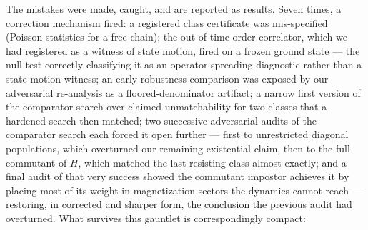 \documentclass[a4paper,11pt,noarxiv]{quantumarticle}
\begin{document}
The mistakes were made, caught, and are reported as results. Seven
times, a correction mechanism fired: a registered class certificate
was mis-specified (Poisson statistics for a free chain); the
out-of-time-order correlator, which we had registered as a witness of
state motion, fired on a frozen ground state --- the null test
correctly classifying it as an operator-spreading diagnostic
\cite{SRC064} rather than a state-motion witness; an early robustness
comparison was exposed by our adversarial re-analysis as a
floored-denominator artifact; a narrow first version of the comparator
search over-claimed unmatchability for two classes that a hardened
search then matched; two successive adversarial audits of the
comparator search each forced it open further --- first to
unrestricted diagonal populations, which overturned our remaining
existential claim, then to the full commutant of $H$, which matched
the last resisting class almost exactly; and a final audit of that
very success showed the commutant impostor achieves it by placing
most of its weight in magnetization sectors the dynamics cannot
reach --- restoring, in corrected and sharper form, the conclusion
the previous audit had overturned. What survives this gauntlet is
correspondingly compact:
\end{document}
